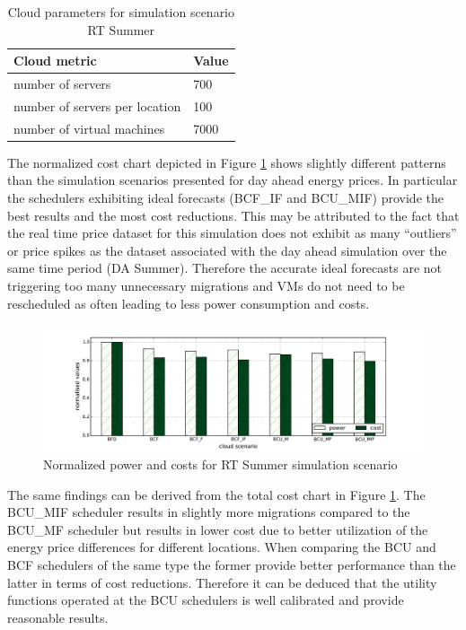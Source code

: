 \begin{table}[htbp]
\centering
\begin{tabular}[\textwidth]{ll}
\toprule
	Cloud metric & Value  \\
\midrule
	number of servers & 700 \\
	number of servers per location & 100 \\
	number of virtual machines & 7000\\
\bottomrule
\end{tabular}
\caption{Cloud parameters for simulation scenario RT Summer}
\label{tab:rt_summer_cloud_parameters}
\end{table}

The normalized cost chart depicted in Figure \ref{fig:RT_Summer_power_vs_cost} shows slightly different patterns than the simulation scenarios presented for day ahead energy prices. In particular the schedulers exhibiting ideal forecasts (BCF\_IF and BCU\_MIF) provide the best results and the most cost reductions. This may be attributed to the fact that the real time price dataset for this simulation does not exhibit as many ``outliers'' or price spikes as the dataset associated with the day ahead simulation over the same time period (DA Summer). Therefore the accurate ideal forecasts are not triggering too many unnecessary migrations and VMs do not need to be rescheduled as often leading to less power consumption and costs. 

\begin{figure}[htbp]
	\centering
		\includegraphics[width=1.00\textwidth]{figures/evaluation_and_results/RT_Summer_power_vs_cost.pdf}
	\caption{Normalized power and costs for RT Summer simulation scenario}
	\label{fig:RT_Summer_power_vs_cost}
\end{figure}

The same findings can be derived from the total cost chart in Figure \ref{fig:RT_Summer_power_vs_cost}. The BCU\_MIF scheduler results in slightly more migrations compared to the BCU\_MF scheduler but results in lower cost due to better utilization of the energy price differences for different locations. When comparing the BCU and BCF schedulers of the same type the former provide better performance than the latter in terms of cost reductions. Therefore it can be deduced that the utility functions operated at the BCU schedulers is well calibrated and provide reasonable results. 

